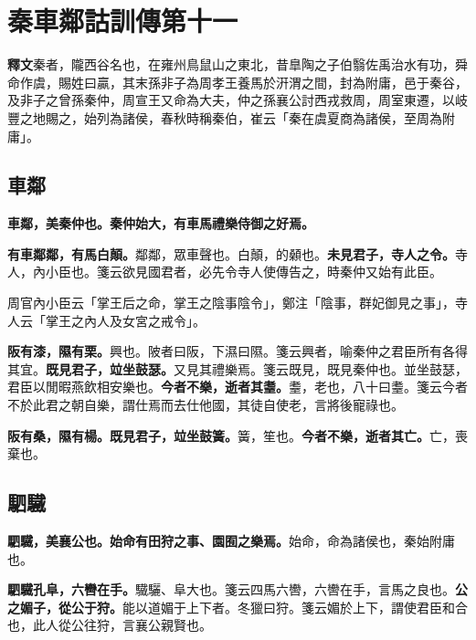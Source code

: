 \chapter{秦車鄰詁訓傳第十一}

\begin{quoting}\textbf{釋文}秦者，隴西谷名也，在雍州鳥鼠山之東北，昔臯陶之子伯翳佐禹治水有功，舜命作虞，賜姓曰贏，其末孫非子為周孝王養馬於汧渭之間，封為附庸，邑于秦谷，及非子之曾孫秦仲，周宣王又命為大夫，仲之孫襄公討西戎救周，周室東遷，以岐豐之地賜之，始列為諸侯，春秋時稱秦伯，崔云「秦在虞夏商為諸侯，至周為附庸」。\end{quoting}

\section{車鄰}


\textbf{車鄰，美秦仲也。秦仲始大，有車馬禮樂侍御之好焉。}

\textbf{有車鄰鄰，有馬白顛。}{\footnotesize 鄰鄰，眾車聲也。白顛，的顙也。}\textbf{未見君子，寺人之令。}{\footnotesize 寺人，內小臣也。箋云欲見國君者，必先令寺人使傳告之，時秦仲又始有此臣。}

\begin{quoting}周官內小臣云「掌王后之命，掌王之陰事陰令」，鄭注「陰事，群妃御見之事」，寺人云「掌王之內人及女宮之戒令」。\end{quoting}

\textbf{阪有漆，隰有栗。}{\footnotesize 興也。陂者曰阪，下濕曰隰。箋云興者，喻秦仲之君臣所有各得其宜。}\textbf{既見君子，竝坐鼓瑟。}{\footnotesize 又見其禮樂焉。箋云既見，既見秦仲也。並坐鼓瑟，君臣以閒暇燕飲相安樂也。}\textbf{今者不樂，逝者其耋。}{\footnotesize 耋，老也，八十曰耋。箋云今者不於此君之朝自樂，謂仕焉而去仕他國，其徒自使老，言將後寵祿也。}

\textbf{阪有桑，隰有楊。既見君子，竝坐鼓簧。}{\footnotesize 簧，笙也。}\textbf{今者不樂，逝者其亡。}{\footnotesize 亡，喪棄也。}

\section{駟驖}


\textbf{駟驖，美襄公也。始命有田狩之事、園囿之樂焉。}{\footnotesize 始命，命為諸侯也，秦始附庸也。}

\textbf{駟驖孔阜，六轡在手。}{\footnotesize 驖驪、阜大也。箋云四馬六轡，六轡在手，言馬之良也。}\textbf{公之媚子，從公于狩。}{\footnotesize 能以道媚于上下者。冬獵曰狩。箋云媚於上下，謂使君臣和合也，此人從公往狩，言襄公親賢也。}

